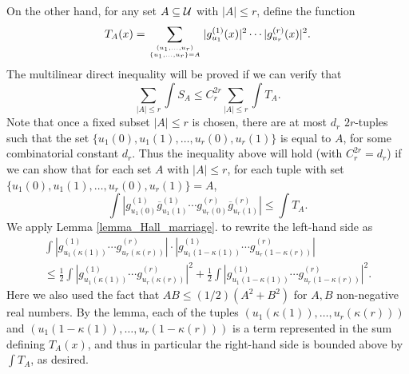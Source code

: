 \documentclass[oneside,11pt]{amsart}
\begin{document}
 On the other hand, for any set $A \subseteq \mathcal{U}$ with $|A| \leq r$, define the function
 \[ T_A(x) =  \sum_{(u_1, \ldots, u_r)  \atop \{u_1 , \ldots, u_r \} = A} |g_{u_1}^{(1)}(x) |^2  \cdots |g_{u_r}^{(r)}(x)|^2 .\]
 The multilinear direct inequality will be proved if we can verify that 
 \[ \sum_{|A| \leq r} \int   S_A    \leq C_r^{2r}  \sum_{|A| \leq r} \int   T_A   .\]
Note that once a fixed subset $|A| \leq r$ is chosen, there are at most $d_r$ $2r$-tuples such that the set $ \{u_1(0),u_1(1), \ldots, u_r(0),u_r(1)\}$ is equal to $A$, for some combinatorial constant $d_r$. Thus the inequality above will hold (with $C_r^{2r}  =d_r$) if we can show that 
for each set $A$ with $|A| \leq r$, for each tuple with set $ \{u_1(0),u_1(1), \ldots, u_r(0),u_r(1)\}=A$,
\[ \int  |g_{u_1(0)}^{(1)}  \overline{g}_{u_1(1)}^{(1)}\cdots g_{u_r(0)}^{(r)} \overline{g}_{u_r(1)}^{(r)}|   \leq   \int  T_A   .\]
We apply Lemma \ref{lemma_Hall_marriage}.
to rewrite the left-hand side as 
\begin{multline*}
 \int |g_{u_1(\kappa(1))}^{(1)}\cdots g_{u_r(\kappa(r))}^{(r)} | \cdot |g_{u_1(1-\kappa(1))}^{(1)}\cdots g_{u_r(1-\kappa(r))}^{(r)} | 
\\
 \leq \frac{1}{2} \int |g_{u_1(\kappa(1))}^{(1)}\cdots g_{u_r(\kappa(r))}^{(r)} |^2   
 	+ \frac{1}{2} \int |g_{u_1(1-\kappa(1))}^{(1)}\cdots g_{u_r(1-\kappa(r))}^{(r)} |^2  .
 \end{multline*}
 Here we also used the fact that  $AB \leq (1/2)(A^2 + B^2)$ for $A,B$ non-negative real numbers.
By the lemma, each of the tuples $(u_1(\kappa(1)), \ldots, u_r(\kappa(r)))$ and $(u_1(1-\kappa(1)), \ldots, u_r(1-\kappa(r)))$ 
is a term represented in the sum defining $T_A(x)$, and thus in particular the right-hand side is bounded above by $\int T_A  $, as desired.
\end{document}
